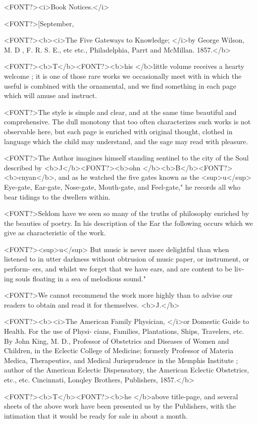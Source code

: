 <FONT?><i>Book Notices.</i>

<FONT?>[September,

<FONT?><b><i>The Five Gateways to Knowledge; </i>by George Wilson, M. D , F. R. S. E., etc etc.,
Philadelphia, Parrt and McMillan. 1857.</b>

<FONT?><b>T</b><FONT?><b>his </b>little volume receives a hearty welcome ; it is one of those rare
works we occasionally meet with in which the useful is combined
with the ornamental, and we find something in each page which will
amuse and instruct.

<FONT?>The style is simple and clear, and at the same time beautiful and
comprehensive. The dull monotony that too often characterizes such
works is not observable here, but each page is enriched with original
thought, clothed in language which the child may understand, and the
sage may read with pleasure.

<FONT?>The Author imagines himself standing sentinel to the city of the Soul
described by <b>J</b><FONT?><b>ohn </b><b>B</b><FONT?><b>cnyan</b>, and as he watched the five gates known
as the <sup>u</sup> Eye-gate, Ear-gate, Nose-gate, Mouth-gate, and Feel-gate," he
records all who bear tidings to the dwellers within.

<FONT?>Seldom have we seen so many of the truths of philosophy enriched
by the beauties of poetry. In his description of the Ear the following
occurs which we give as characteristic of the work.

<FONT?><sup>u</sup> But music is never more delightful than when listened to in utter
darkness without obtrusion of music paper, or instrument, or perform-
ers, and whilst we forget that we have ears, and are content to be liv-
ing souls floating in a sea of melodious sound."

<FONT?>We cannot recommend the work more highly than to advise our readers
to obtain and read it for themselves. <b>J.</b>

<FONT?><b><i>The American Family Physician, </i>or Domestic Guide to Health. For the use of Physi-
cians, Families, Plantations, Ships, Travelers, etc. By John King, M. D., Professor of
Obstetrics and Diseases of Women and Children, in the Eclectic College of Medicine;
formerly Professor of Materia Medica, Therapeutics, and Medical Jurisprudence in the
Memphis Institute ; author of the American Eclectic Dispensatory, the American
Eclectic Obstetrics, etc., etc. Cincinnati, Lonqley Brothers, Publishers, 1857.</b>

<FONT?><b>T</b><FONT?><b>he </b>above title-page, and several sheets of the above work have
been presented us by the Publishers, with the intimation that it would
be ready for sale in about a month.

